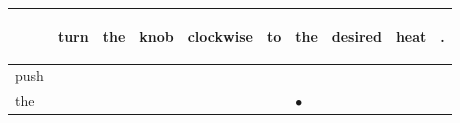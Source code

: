 \documentclass[landscape]{article}
\newcommand{\ssp}{\hspace{2pt}}
\newcommand{\mex}{\cellcolor{g}$\bullet$}
\begin{document}
\noindent\begin{tabular}{|l|p{10pt}|p{10pt}|p{10pt}|p{10pt}|p{10pt}|p{10pt}|p{10pt}|p{10pt}|p{10pt}|}
\hline
&\begin{sideways}\cellcolor{ref0}turn\hspace{12pt}\end{sideways}&\begin{sideways}\cellcolor{ref1}the\hspace{12pt}\end{sideways}&\begin{sideways}\cellcolor{ref2}knob\hspace{12pt}\end{sideways}&\begin{sideways}\cellcolor{ref3}clockwise\hspace{12pt}\end{sideways}&\begin{sideways}\cellcolor{ref4}to\hspace{12pt}\end{sideways}&\begin{sideways}\cellcolor{ref5}the\hspace{12pt}\end{sideways}&\begin{sideways}\cellcolor{ref6}desired\hspace{12pt}\end{sideways}&\begin{sideways}\cellcolor{ref7}heat\hspace{12pt}\end{sideways}&\begin{sideways}\cellcolor{ref8}.\hspace{12pt}\end{sideways}\\
\hline
\ssp push \ssp&\hspace{2pt}&\hspace{2pt}&\hspace{2pt}&\hspace{2pt}&\hspace{2pt}&\hspace{2pt}&\hspace{2pt}&\hspace{2pt}&\hspace{2pt}\\
\hline
\ssp \cellcolor{ref5}the \ssp&\hspace{2pt}&\hspace{2pt}&\hspace{2pt}&\hspace{2pt}&\hspace{2pt}&\hspace{2pt}\mex&\hspace{2pt}&\hspace{2pt}&\hspace{2pt}\\

\end{tabular}
\end{document}
